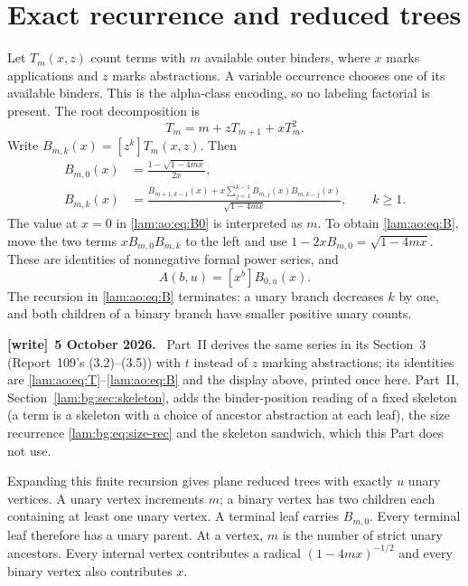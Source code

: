 \documentclass[11pt,a4paper]{article}
\numberwithin{equation}{section}
\theoremstyle{remark}
\newenvironment{writenote}[1][]{\par\smallskip\begingroup\small
 \noindent\textbf{[write]}\if\relax\detokenize{#1}\relax\else~\textbf{#1.}\fi\ }%
 {\par\endgroup\smallskip}
\begin{document}
\section{Exact recurrence and reduced trees}\label{lam:ao:sec:recurrence}
Let $T_m(x,z)$ count terms with $m$ available outer binders, where $x$ marks applications and $z$ marks abstractions. A variable occurrence chooses one of its available binders. This is the alpha-class encoding, so no labeling factorial is present. The root decomposition is
\begin{equation}\label{lam:ao:eq:T}
 T_m=m+zT_{m+1}+xT_m^2.
\end{equation}
Write $B_{m,k}(x)=[z^k]T_m(x,z)$. Then
\begin{align}
 B_{m,0}(x)&=\frac{1-\sqrt{1-4mx}}{2x},\label{lam:ao:eq:B0}\\
 B_{m,k}(x)&=\frac{B_{m+1,k-1}(x)+x\sum_{j=1}^{k-1}B_{m,j}(x)B_{m,k-j}(x)}
                  {\sqrt{1-4mx}},\qquad k\ge1.\label{lam:ao:eq:B}
\end{align}
The value at $x=0$ in \eqref{lam:ao:eq:B0} is interpreted as $m$. To obtain \eqref{lam:ao:eq:B}, move the two terms $xB_{m,0}B_{m,k}$ to the left and use $1-2xB_{m,0}=\sqrt{1-4mx}$. These are identities of nonnegative formal power series, and
\[
 A(b,u)=[x^b]B_{0,u}(x).
\]
The recursion in \eqref{lam:ao:eq:B} terminates: a unary branch decreases $k$ by one, and both children of a binary branch have smaller positive unary counts.
\begin{writenote}[5 October 2026]
Part~II derives the same series in its Section~3 (Report~109's (3.2)--(3.5)) with $t$ instead of $z$ marking abstractions; its identities are \eqref{lam:ao:eq:T}--\eqref{lam:ao:eq:B} and the display above, printed once here. Part~II, Section~\ref{lam:bg:sec:skeleton}, adds the binder-position reading of a fixed skeleton (a term is a skeleton with a choice of ancestor abstraction at each leaf), the size recurrence \eqref{lam:bg:eq:size-rec} and the skeleton sandwich, which this Part does not use.
\end{writenote}

Expanding this finite recursion gives plane reduced trees with exactly $u$ unary vertices. A unary vertex increments $m$; a binary vertex has two children each containing at least one unary vertex. A terminal leaf carries $B_{m,0}$. Every terminal leaf therefore has a unary parent. At a vertex, $m$ is the number of strict unary ancestors. Every internal vertex contributes a radical $(1-4mx)^{-1/2}$ and every binary vertex also contributes $x$.
\end{document}
